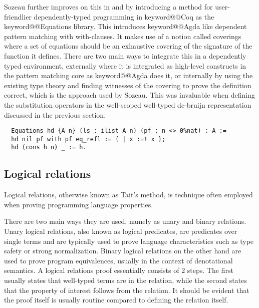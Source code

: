 \documentclass[12pt, final]{article}
\makeatletter
\def\<#1>{\csname keyword@@#1\endcsname}
\makeatother
\begin{document}
Sozeau further improves on this in \cite{Sozeau2010} and \cite{Sozeau2019} by introducing a method for user-friendlier dependently-typed programming in \<Coq> as the \<Equations> library.
This introduces \<Agda> like dependent pattern matching with with-clauses.
It makes use of a notion called coverings where a set of equations should be an exhaustive covering of the signature of the function it defines.
There are two main ways to integrate this in a dependently typed environment, externally where it is integrated as high-level constructs in the pattern matching core as \<Agda> does it, or internally by using the existing type theory and finding witnesses of the covering to prove the definition correct, which is the approach used by Sozeau.
This was invaluable when defining the substitution operators in the well-scoped well-typed de-bruijn representation discussed in the previous section.

\begin{listing}
  \begin{verbatim}
  Equations hd {A n} (ls : ilist A n) (pf : n <> 0%nat) : A :=
  hd nil pf with pf eq_refl := { | x :=! x };
  hd (cons h n) _ := h.
  \end{verbatim}
  \caption{Definition of hd using \<Equations>}
  \label{lst:dt_ilist_hd_equations}
\end{listing}


\subsection{Logical relations}

Logical relations, otherwise known as Tait's method, is technique often employed when proving programming language properties\cite{skorstengaard2019introduction}.

There are two main ways they are used, namely as unary and binary relations.
Unary logical relations, also known as logical predicates, are predicates over single terms and are typically used to prove language characteristics such as type safety or strong normalization.
Binary logical relations on the other hand are used to prove program equivalences, usually in the context of denotational semantics.
A logical relations proof essentially consists of 2 steps.
The first usually states that well-typed terms are in the relation, while the second states that the property of interest follows from the relation.
It should be evident that the proof itself is usually routine compared to defining the relation itself.
\end{document}
